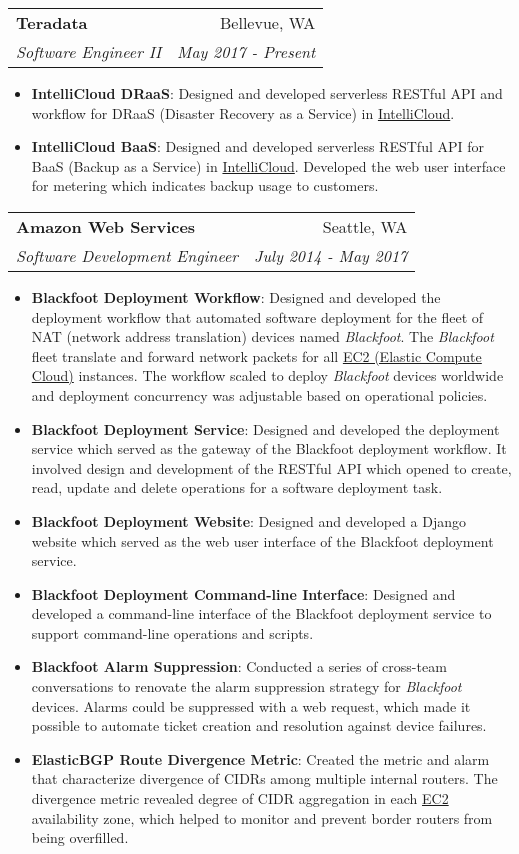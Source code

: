 \documentclass[letterpaper,11pt]{article}
\makeatletter
\newcommand{\resumeItem}[2]{
  \item\small{
    \textbf{#1}{: #2 \vspace{-2pt}}
  }
}
\newcommand{\resumeSubheading}[4]{
  \vspace{-1pt}\item
    \begin{tabular*}{0.97\textwidth}{l@{\extracolsep{\fill}}r}
      \textbf{#1} & #2 \\
      \textit{\small#3} & \textit{\small #4} \\
    \end{tabular*}\vspace{-5pt}
}
\newcommand{\resumeItemListStart}{\begin{itemize}}
\newcommand{\resumeItemListEnd}{\end{itemize}\vspace{-5pt}}
\makeatother
\begin{document}
    \resumeSubheading
      {Teradata}{Bellevue, WA}
      {Software Engineer II}{May 2017 - Present}
      \resumeItemListStart
        \resumeItem{IntelliCloud DRaaS}
          {Designed and developed serverless RESTful API and workflow for DRaaS (Disaster Recovery as a Service) in \href {https://console.intellicloud.teradata.com}{IntelliCloud}.}
        \resumeItem{IntelliCloud BaaS}
          {Designed and developed serverless RESTful API for BaaS (Backup as a Service) in \href{https://console.intellicloud.teradata.com}{IntelliCloud}. Developed the web user interface for metering which indicates backup usage to customers.}
      \resumeItemListEnd
    \resumeSubheading
      {Amazon Web Services}{Seattle, WA}
      {Software Development Engineer}{July 2014 - May 2017}
      \resumeItemListStart
        \resumeItem{Blackfoot Deployment Workflow}
          {Designed and developed the deployment workflow that automated software deployment for the fleet of NAT (network address translation) devices named \textit{Blackfoot}. The \textit{Blackfoot} fleet translate and forward network packets for all \href{https://aws.amazon.com/ec2/}{EC2 (Elastic Compute Cloud)} instances. The workflow scaled to deploy \textit{Blackfoot} devices worldwide and deployment concurrency was adjustable based on operational policies.}
        \resumeItem{Blackfoot Deployment Service}
          {Designed and developed the deployment service which served as the gateway of the Blackfoot deployment workflow. It involved design and development of the RESTful API which opened to create, read, update and delete operations for a software deployment task.}
        \resumeItem{Blackfoot Deployment Website}
          {Designed and developed a Django website which served as the web user interface of the Blackfoot deployment service.}
        \resumeItem{Blackfoot Deployment Command-line Interface}
          {Designed and developed a command-line interface of the Blackfoot deployment service to support command-line operations and scripts.}
        \resumeItem{Blackfoot Alarm Suppression}
          {Conducted a series of cross-team conversations to renovate the alarm suppression strategy for \textit{Blackfoot} devices. Alarms could be suppressed with a web request, which made it possible to automate ticket creation and resolution against device failures.  }
        \resumeItem{ElasticBGP Route Divergence Metric}
          {Created the metric and alarm that characterize divergence of CIDRs among multiple internal routers. The divergence metric revealed degree of CIDR aggregation in each \href{https://aws.amazon.com/ec2/}{EC2} availability zone, which helped to monitor and prevent border routers from being overfilled.}
      \resumeItemListEnd
\end{document}
